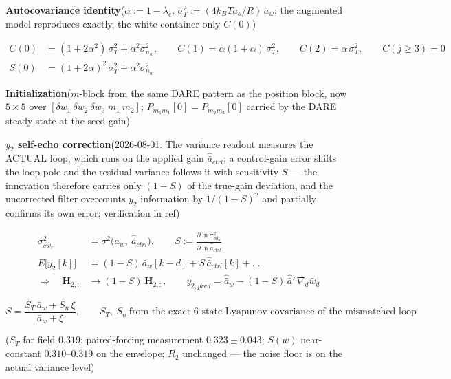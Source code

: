 \documentclass[11pt,a4paper,fontset=none]{ctexart}
\begin{document}
\textbf{Autocovariance identity}\quad ($\alpha := 1-\lambda_c$,
$\sigma^2_T := (4k_BT a_o/R)\,\bar{a}_w$; the augmented model reproduces
exactly, the white container only $C(0)$)

\begin{align*}
C(0) &= (1+2\alpha^2)\,\sigma^2_T + \alpha^2\sigma^2_{n_w}, \qquad
C(1) = \alpha(1+\alpha)\,\sigma^2_T, \qquad
C(2) = \alpha\,\sigma^2_T, \qquad C(j\geq3) = 0 \\
S(0) &= (1+2\alpha)^2\,\sigma^2_T + \alpha^2\sigma^2_{n_w}
\end{align*}

\textbf{Initialization}\quad ($m$-block from the same DARE pattern as
the position block, now $5\times5$ over
$[\delta\bar{w}_1\ \delta\bar{w}_2\ \delta\bar{w}_3\ m_1\ m_2]$;
$P_{m_1m_1}[0] = P_{m_2m_2}[0]$ carried by the DARE steady state at the
seed gain)

\textbf{$y_2$ self-echo correction}\quad (2026-08-01.  The variance
readout measures the ACTUAL loop, which runs on the applied gain
$\hat{\bar{a}}_{ctrl}$; a control-gain error shifts the loop pole and
the residual variance follows it with sensitivity $S$ --- the innovation
therefore carries only $(1{-}S)$ of the true-gain deviation, and the
uncorrected filter overcounts $y_2$ information by $1/(1{-}S)^2$ and
partially confirms its own error; verification in ref)

\begin{align*}
\sigma^2_{\delta\bar{w}_r}
  &= \sigma^2\bigl(\bar{a}_w,\ \hat{\bar{a}}_{ctrl}\bigr),
\qquad
S := \frac{\partial \ln \sigma^2_{\delta\bar{w}_r}}
          {\partial \ln \hat{\bar{a}}_{ctrl}} \\
E\bigl[y_2[k]\bigr]
  &= (1-S)\,\bar{a}_w[k-d] + S\,\hat{\bar{a}}_{ctrl}[k] + \ldots \\
\Longrightarrow\quad
\mathbf{H}_{2,:} &\to (1-S)\,\mathbf{H}_{2,:},
\qquad
y_{2,pred} = \hat{\bar{a}}_w - (1-S)\,\hat{\bar{a}}'\,\nabla_d\bar{w}_d
\end{align*}

\begin{equation*}
S = \frac{S_T\,\bar{a}_w + S_n\,\xi}{\bar{a}_w + \xi},
\qquad
S_T,\ S_n\ \text{from the exact 6-state Lyapunov covariance of the
mismatched loop}
\end{equation*}

($S_T$ far field $0.319$; paired-forcing measurement
$0.323 \pm 0.043$; $S(\bar{w})$ near-constant $0.310$--$0.319$ on the
envelope; $R_2$ unchanged --- the noise floor is on the actual variance
level)
\end{document}
